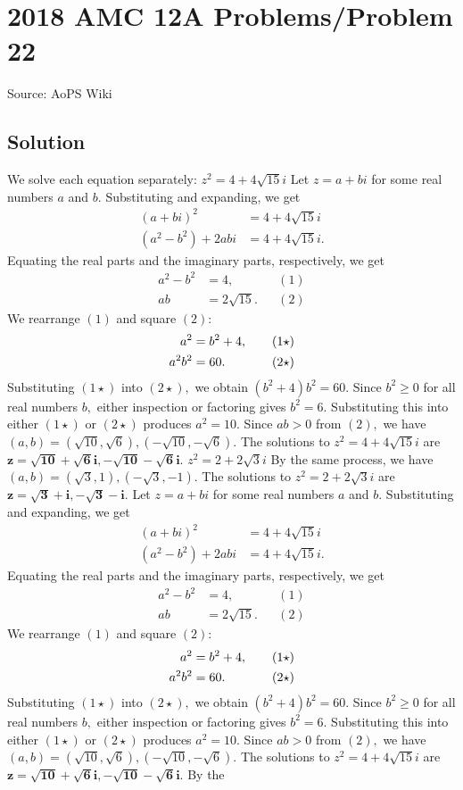 \documentclass[12pt]{article}
\begin{document}
\section*{{2018 AMC 12A Problems/Problem 22}}
Source: AoPS Wiki

\subsection*{Solution}
We solve each equation separately: $z^2=4+4\sqrt{15}i$ Let $z=a+bi$ for some real numbers $a$ and $b.$ Substituting and expanding, we get \begin{align*} (a+bi)^2&=4+4\sqrt{15}i \\ \left(a^2-b^2\right)+2abi&=4+4\sqrt{15}i. \end{align*} Equating the real parts and the imaginary parts, respectively, we get \begin{align*} a^2-b^2&=4, &&(1) \\ ab&=2\sqrt{15}. &&(2) \end{align*} We rearrange $(1)$ and square $(2):$ \begin{align*} a^2&=b^2+4, \hspace{4mm} &&(1\star) \\ a^2b^2&=60. &&(2\star) \end{align*} Substituting $(1\star)$ into $(2\star),$ we obtain $\left(b^2+4\right)b^2=60.$ Since $b^2\geq0$ for all real numbers $b,$ either inspection or factoring gives $b^2=6.$ Substituting this into either $(1\star)$ or $(2\star)$ produces $a^2=10.$ Since $ab>0$ from $(2),$ we have $(a,b)=\left(\sqrt{10},\sqrt{6}\right),\left(-\sqrt{10},-\sqrt{6}\right).$ The solutions to $z^2=4+4\sqrt{15}i$ are $\boldsymbol{z=\sqrt{10}+\sqrt{6}i,-\sqrt{10}-\sqrt{6}i}.$ $z^2=2+2\sqrt{3}i$ By the same process, we have $(a,b)=\left(\sqrt3,1\right),\left(-\sqrt3,-1\right).$ The solutions to $z^2=2+2\sqrt{3}i$ are $\boldsymbol{z=\sqrt3+i,-\sqrt3-i}.$ Let $z=a+bi$ for some real numbers $a$ and $b.$ Substituting and expanding, we get \begin{align*} (a+bi)^2&=4+4\sqrt{15}i \\ \left(a^2-b^2\right)+2abi&=4+4\sqrt{15}i. \end{align*} Equating the real parts and the imaginary parts, respectively, we get \begin{align*} a^2-b^2&=4, &&(1) \\ ab&=2\sqrt{15}. &&(2) \end{align*} We rearrange $(1)$ and square $(2):$ \begin{align*} a^2&=b^2+4, \hspace{4mm} &&(1\star) \\ a^2b^2&=60. &&(2\star) \end{align*} Substituting $(1\star)$ into $(2\star),$ we obtain $\left(b^2+4\right)b^2=60.$ Since $b^2\geq0$ for all real numbers $b,$ either inspection or factoring gives $b^2=6.$ Substituting this into either $(1\star)$ or $(2\star)$ produces $a^2=10.$ Since $ab>0$ from $(2),$ we have $(a,b)=\left(\sqrt{10},\sqrt{6}\right),\left(-\sqrt{10},-\sqrt{6}\right).$ The solutions to $z^2=4+4\sqrt{15}i$ are $\boldsymbol{z=\sqrt{10}+\sqrt{6}i,-\sqrt{10}-\sqrt{6}i}.$ By the 
\end{document}
